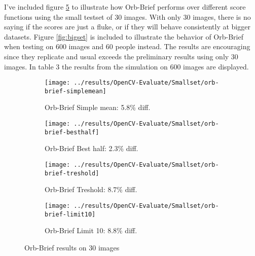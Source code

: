 \documentclass{article}
\begin{document}
I've included figure \ref{fig:smallset-orb-brief} to illustrate how Orb-Brief 
performs over different score functions using the small testset of 30 images.  
With only 30 images, there is no saying if the scores are just a fluke, or if 
they will behave consistently at bigger datasets. Figure \ref{fig:bigset} is 
included to illustrate the behavior of Orb-Brief when testing on 600 images and 
60 people instead. The results are encouraging since they replicate and 
usual exceeds the preliminary results using only 30 images. In table 3 
the results from the simulation on 600 images are displayed.

\begin{figure}
        \centering
		\begin{subfigure}[b]{0.45\textwidth}
                \centering
				\texttt{[image: ../results/OpenCV-Evaluate/Smallset/orb-brief-simplemean]}
				\caption{Orb-Brief Simple mean: 5.8\% diff.}
				\label{fig:smallset-orb-brief-simplemean}
        \end{subfigure}%
		\quad %
		\begin{subfigure}[b]{0.45\textwidth}
				\centering
				\texttt{[image: ../results/OpenCV-Evaluate/Smallset/orb-brief-besthalf]}
				\caption{Orb-Brief Best half: 2.3\% diff.}
				\label{fig:smallset-orb-brief-besthalf}
		\end{subfigure}


		\begin{subfigure}[b]{0.45\textwidth}
				\centering
				\texttt{[image: ../results/OpenCV-Evaluate/Smallset/orb-brief-treshold]}
				\caption{Orb-Brief Treshold: 8.7\% diff.}
				\label{fig:smallset-orb-brief-treshold}
		\end{subfigure}
		\quad%
		\begin{subfigure}[b]{0.45\textwidth}
				\centering
				\texttt{[image: ../results/OpenCV-Evaluate/Smallset/orb-brief-limit10]}
				\caption{Orb-Brief Limit 10: 8.8\% diff.}
				\label{fig:smallset-orb-brief-limit10}
		\end{subfigure}
		\caption{Orb-Brief results on 30 images}\label{fig:smallset-orb-brief}
\end{figure}
\end{document}
